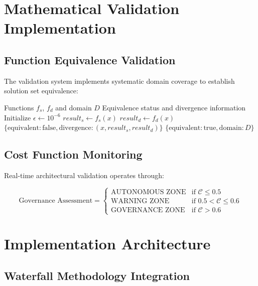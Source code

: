 \documentclass{article}
\begin{document}
\section{Mathematical Validation Implementation}

\subsection{Function Equivalence Validation}

The validation system implements systematic domain coverage to establish solution set equivalence:

\begin{algorithm}[H]
\caption{Domain-Based Equivalence Verification}
\begin{algorithmic}[1]
\REQUIRE Functions $f_s$, $f_d$ and domain $D$
\ENSURE Equivalence status and divergence information
\STATE Initialize $\epsilon \leftarrow 10^{-6}$
    \STATE $result_s \leftarrow f_s(x)$
    \STATE $result_d \leftarrow f_d(x)$
        \RETURN $\{\text{equivalent}: \text{false}, \text{divergence}: (x, result_s, result_d)\}$
    \ENDIF
\ENDFOR
\RETURN $\{\text{equivalent}: \text{true}, \text{domain}: D\}$
\end{algorithmic}
\end{algorithm}

\subsection{Cost Function Monitoring}

Real-time architectural validation operates through:

\begin{equation}
\text{Governance Assessment} = \begin{cases}
\text{AUTONOMOUS ZONE} & \text{if } \mathcal{C} \leq 0.5 \\
\text{WARNING ZONE} & \text{if } 0.5 < \mathcal{C} \leq 0.6 \\
\text{GOVERNANCE ZONE} & \text{if } \mathcal{C} > 0.6
\end{cases}
\end{equation}

\section{Implementation Architecture}

\subsection{Waterfall Methodology Integration}
\end{document}
